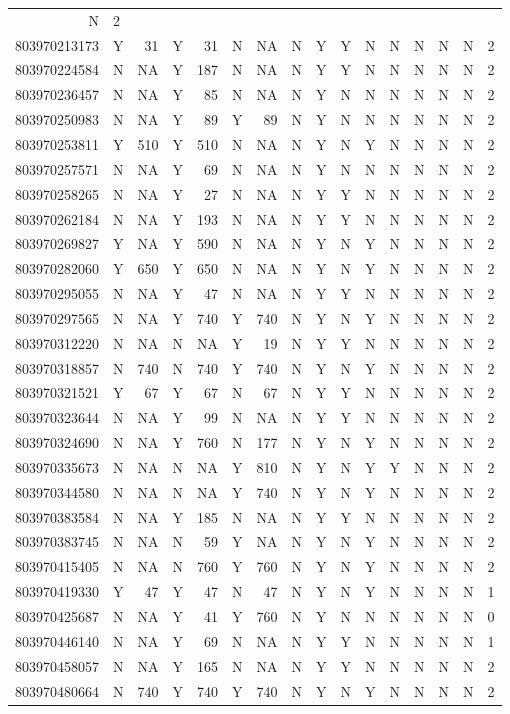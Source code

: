 \documentclass[]{article}
\begin{document}
\begin{longtable}[]{@{}rlrlrlrllllllllr@{}}
N & 2\tabularnewline
803970213173 & Y & 31 & Y & 31 & N & NA & N & Y & Y & N & N & N & N & N
& 2\tabularnewline
803970224584 & N & NA & Y & 187 & N & NA & N & Y & Y & N & N & N & N & N
& 2\tabularnewline
803970236457 & N & NA & Y & 85 & N & NA & N & Y & N & N & N & N & N & N
& 2\tabularnewline
803970250983 & N & NA & Y & 89 & Y & 89 & N & Y & N & N & N & N & N & N
& 2\tabularnewline
803970253811 & Y & 510 & Y & 510 & N & NA & N & Y & N & Y & N & N & N &
N & 2\tabularnewline
803970257571 & N & NA & Y & 69 & N & NA & N & Y & N & N & N & N & N & N
& 2\tabularnewline
803970258265 & N & NA & Y & 27 & N & NA & N & Y & Y & N & N & N & N & N
& 2\tabularnewline
803970262184 & N & NA & Y & 193 & N & NA & N & Y & Y & N & N & N & N & N
& 2\tabularnewline
803970269827 & Y & NA & Y & 590 & N & NA & N & Y & N & Y & N & N & N & N
& 2\tabularnewline
803970282060 & Y & 650 & Y & 650 & N & NA & N & Y & N & Y & N & N & N &
N & 2\tabularnewline
803970295055 & N & NA & Y & 47 & N & NA & N & Y & Y & N & N & N & N & N
& 2\tabularnewline
803970297565 & N & NA & Y & 740 & Y & 740 & N & Y & N & Y & N & N & N &
N & 2\tabularnewline
803970312220 & N & NA & N & NA & Y & 19 & N & Y & Y & N & N & N & N & N
& 2\tabularnewline
803970318857 & N & 740 & N & 740 & Y & 740 & N & Y & N & Y & N & N & N &
N & 2\tabularnewline
803970321521 & Y & 67 & Y & 67 & N & 67 & N & Y & Y & N & N & N & N & N
& 2\tabularnewline
803970323644 & N & NA & Y & 99 & N & NA & N & Y & Y & N & N & N & N & N
& 2\tabularnewline
803970324690 & N & NA & Y & 760 & N & 177 & N & Y & N & Y & N & N & N &
N & 2\tabularnewline
803970335673 & N & NA & N & NA & Y & 810 & N & Y & N & Y & Y & N & N & N
& 2\tabularnewline
803970344580 & N & NA & N & NA & Y & 740 & N & Y & N & Y & N & N & N & N
& 2\tabularnewline
803970383584 & N & NA & Y & 185 & N & NA & N & Y & Y & N & N & N & N & N
& 2\tabularnewline
803970383745 & N & NA & N & 59 & Y & NA & N & Y & N & Y & N & N & N & N
& 2\tabularnewline
803970415405 & N & NA & N & 760 & Y & 760 & N & Y & N & Y & N & N & N &
N & 2\tabularnewline
803970419330 & Y & 47 & Y & 47 & N & 47 & N & Y & N & Y & N & N & N & N
& 1\tabularnewline
803970425687 & N & NA & Y & 41 & Y & 760 & N & Y & N & N & N & N & N & N
& 0\tabularnewline
803970446140 & N & NA & Y & 69 & N & NA & N & Y & Y & N & N & N & N & N
& 1\tabularnewline
803970458057 & N & NA & Y & 165 & N & NA & N & Y & Y & N & N & N & N & N
& 2\tabularnewline
803970480664 & N & 740 & Y & 740 & Y & 740 & N & Y & N & Y & N & N & N &
N & 2\tabularnewline
\bottomrule
\end{longtable}
\end{document}
